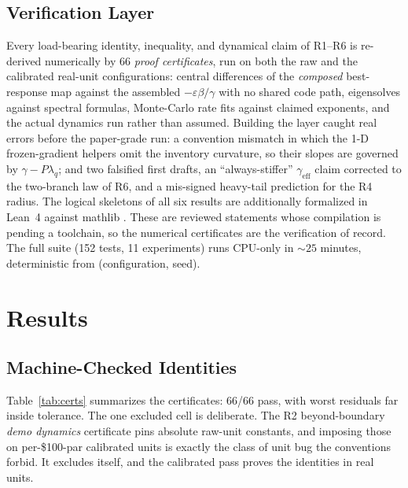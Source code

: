 \documentclass[sigconf]{acmart}
\newcommand{\eps}{\varepsilon}
\newcommand{\geff}{\gamma_{\mathrm{eff}}}
\begin{document}
\subsection{Verification Layer}
\label{sec:verification}
Every load-bearing identity, inequality, and dynamical claim of R1--R6 is
re-derived numerically by 66 \emph{proof certificates}, run on both the raw
and the calibrated real-unit configurations: central differences of the
\emph{composed} best-response map against the assembled $-\eps\beta/\gamma$
with no shared code path, eigensolves against spectral formulas,
Monte-Carlo rate fits against claimed exponents, and the actual dynamics run
rather than assumed. Building the layer caught real errors before the
paper-grade run: a convention mismatch in which the 1-D frozen-gradient
helpers omit the inventory curvature, so their slopes are governed by
$\gamma-P\lambda_q$; and two falsified first drafts, an ``always-stiffer''
$\geff$ claim corrected to the two-branch law of R6, and a mis-signed
heavy-tail prediction for the R4 radius. The logical skeletons
of all six results are additionally formalized in Lean~4 against mathlib
\cite{moura2021lean,mathlib2020}. These are reviewed statements whose
compilation is pending a toolchain, so the numerical certificates are the
verification of record. The full suite (152 tests, 11 experiments) runs
CPU-only in ${\sim}25$ minutes, deterministic from (configuration, seed).

\section{Results}
\label{sec:results}

\subsection{Machine-Checked Identities}
Table~\ref{tab:certs} summarizes the certificates: 66/66 pass, with worst
residuals far inside tolerance. The one excluded cell is deliberate. The R2
beyond-boundary \emph{demo dynamics} certificate pins absolute raw-unit
constants, and imposing those on per-\$100-par calibrated units is exactly
the class of unit bug the conventions forbid. It excludes itself, and the
calibrated pass proves the identities in real units.
\end{document}
